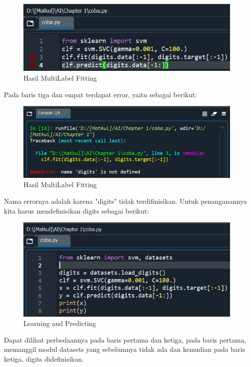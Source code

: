     \begin{figure}[H]
    \centering
    \includegraphics[width=13cm]{figures/1184023/error/1.PNG}
    \caption{Hasil MultiLabel Fitting}
    \end{figure}

\par Pada baris tiga dan empat terdapat error, yaitu sebagai berikut:

    \begin{figure}[H]
    \centering
    \includegraphics[width=13cm]{figures/1184023/error/2.PNG}
    \caption{Hasil MultiLabel Fitting}
    \end{figure}

\par Nama errornya adalah karena "digits" tidak terdifinisikan. Untuk penanganannya kita harus mendefinisikan digits sebagai berikut:

    \begin{figure}[H]
    \centering
    \includegraphics[width=13cm]{figures/1184023/12.PNG}
    \caption{Learning and Predicting}
    \end{figure}

\par Dapat dilihat perbedaannya pada baris pertama dan ketiga, pada baris pertama, memanggil modul datasets yang sebelumnya tidak ada dan kemudian pada baris ketiga, digits didefinisikan.